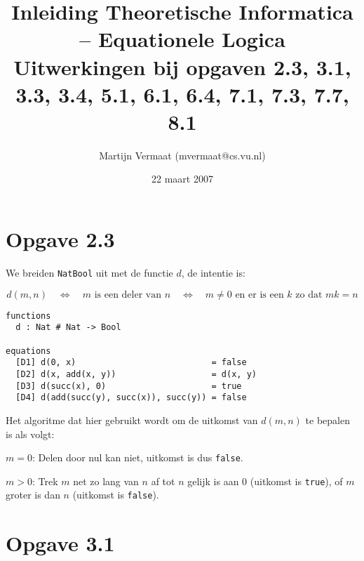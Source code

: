 \documentclass[a4paper,11pt]{article}
\title{Inleiding Theoretische Informatica -- Equationele Logica\\
\normalsize{Uitwerkingen bij opgaven 2.3, 3.1, 3.3, 3.4, 5.1, 6.1, 6.4, 7.1, 7.3, 7.7, 8.1}}
\author{Martijn Vermaat (mvermaat@cs.vu.nl)}
\date{22 maart 2007}
\begin{document}
\maketitle


\section*{Opgave 2.3}

We breiden \verb|NatBool| uit met de functie $d$, de intentie is:

\begin{displaymath}
d(m, n) \quad \Longleftrightarrow \quad \mbox{$m$ is een deler van $n$} \quad \Longleftrightarrow \quad \mbox{$m \neq 0$ en er is een $k$ zo dat $m k
= n$}
\end{displaymath}

\begin{verbatim}
functions
  d : Nat # Nat -> Bool

equations
  [D1] d(0, x)                           = false
  [D2] d(x, add(x, y))                   = d(x, y)
  [D3] d(succ(x), 0)                     = true
  [D4] d(add(succ(y), succ(x)), succ(y)) = false
\end{verbatim}

Het algoritme dat hier gebruikt wordt om de uitkomst van $d(m, n)$ te
bepalen is als volgt:

\begin{description}

\item{$m=0$:}
Delen door nul kan niet, uitkomst is dus \verb|false|.

\item{$m>0$:}
Trek $m$ net zo lang van $n$ af tot $n$ gelijk is aan $0$ (uitkomst is
\verb|true|), of $m$ groter is dan $n$ (uitkomst is \verb|false|).

\end{description}


\section*{Opgave 3.1}
\end{document}
